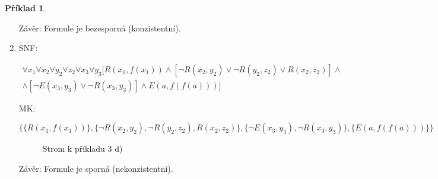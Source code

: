 \documentclass[a4paper]{article}
\theoremstyle{definition}
\newtheorem{priklad}{Příklad}
\begin{document}
\begin{priklad}
\begin{enumerate}
        Závěr: Formule je bezesporná (konzistentní).

        \item SNF:

        {\setlength{\mathindent}{0cm}
        \setlength\abovedisplayskip{-1.5em}
        \begin{multline*}
        \forall x_1\forall x_2\forall y_2\forall z_2\forall x_3\forall y_3[R(x_1,f(x_1))\wedge [\neg R(x_2,y_2)\vee \neg R(y_2,z_2)\vee R(x_2,z_2)]\wedge \\\wedge[\neg E(x_3,y_3)\vee\neg R(x_3,y_3)]\wedge E(a,f(f(a)))]
        \end{multline*}
        }

        MK:

        $ \{ \{R(x_1,f(x_1))\}, \{\neg R(x_2,y_2), \neg R(y_2,z_2), R(x_2,z_2)\},\{\neg E(x_3,y_3),\neg R(x_3,y_3)\},\{E(a,f(f(a)))\} \} $

        \begin{figure}[htb]
            \centering
            
            \caption{Strom k příkladu 3 d)}
        \end{figure}

        Závěr: Formule je sporná (nekonzistentní).
    \end{enumerate}
\end{priklad}
\end{document}
